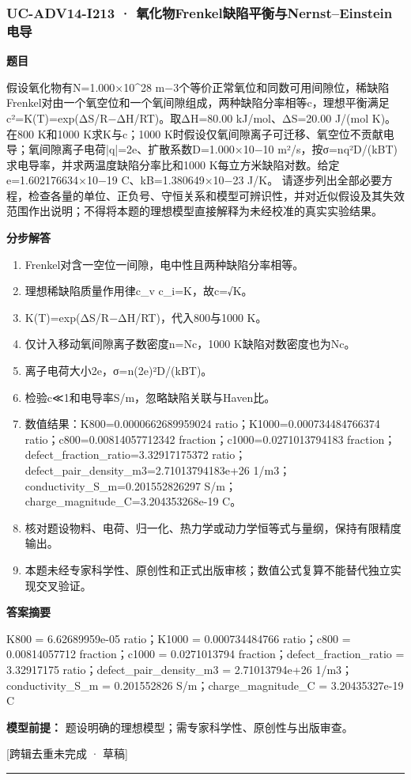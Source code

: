 \documentclass[UTF8,11pt,a4paper]{ctexart}
\begin{document}
\subsubsection*{UC-ADV14-I213 · 氧化物Frenkel缺陷平衡与Nernst–Einstein电导}
\noindent\textbf{题目}\par
假设氧化物有N=1.000×10\textasciicircum{}28 m−3个等价正常氧位和同数可用间隙位，稀缺陷Frenkel对由一个氧空位和一个氧间隙组成，两种缺陷分率相等c，理想平衡满足c²=K(T)=exp(ΔS/R−ΔH/RT)。取ΔH=80.00 kJ/mol、ΔS=20.00 J/(mol K)。在800 K和1000 K求K与c；1000 K时假设仅氧间隙离子可迁移、氧空位不贡献电导；氧间隙离子电荷|q|=2e、扩散系数D=1.000×10−10 m²/s，按σ=nq²D/(kBT)求电导率，并求两温度缺陷分率比和1000 K每立方米缺陷对数。给定e=1.602176634×10−19 C、kB=1.380649×10−23 J/K。 请逐步列出全部必要方程，检查各量的单位、正负号、守恒关系和模型可辨识性，并对近似假设及其失效范围作出说明；不得将本题的理想模型直接解释为未经校准的真实实验结果。\par
\medskip\noindent\textbf{分步解答}
\begin{enumerate}
\item Frenkel对含一空位一间隙，电中性且两种缺陷分率相等。
\item 理想稀缺陷质量作用律c\_v c\_i=K，故c=√K。
\item K(T)=exp(ΔS/R−ΔH/RT)，代入800与1000 K。
\item 仅计入移动氧间隙离子数密度n=Nc，1000 K缺陷对数密度也为Nc。
\item 离子电荷大小2e，σ=n(2e)²D/(kBT)。
\item 检验c≪1和电导率S/m，忽略缺陷关联与Haven比。
\item 数值结果：K800=0.0000662689959024 ratio；K1000=0.000734484766374 ratio；c800=0.00814057712342 fraction；c1000=0.0271013794183 fraction；defect\_fraction\_ratio=3.32917175372 ratio；defect\_pair\_density\_m3=2.71013794183e+26 1/m3；conductivity\_S\_m=0.201552826297 S/m；charge\_magnitude\_C=3.204353268e-19 C。
\item 核对题设物料、电荷、归一化、热力学或动力学恒等式与量纲，保持有限精度输出。
\item 本题未经专家科学性、原创性和正式出版审核；数值公式复算不能替代独立实现交叉验证。
\end{enumerate}
\noindent\textbf{答案摘要}\par
K800 = 6.62689959e-05 ratio；K1000 = 0.000734484766 ratio；c800 = 0.00814057712 fraction；c1000 = 0.0271013794 fraction；defect\_fraction\_ratio = 3.32917175 ratio；defect\_pair\_density\_m3 = 2.71013794e+26 1/m3；conductivity\_S\_m = 0.201552826 S/m；charge\_magnitude\_C = 3.20435327e-19 C\par
\noindent\textbf{模型前提：}
题设明确的理想模型；需专家科学性、原创性与出版审查。\par
\noindent\textcolor{red!65!black}{[跨辑去重未完成 · 草稿]} \par
\medskip\hrule\medskip
{}
\end{document}
